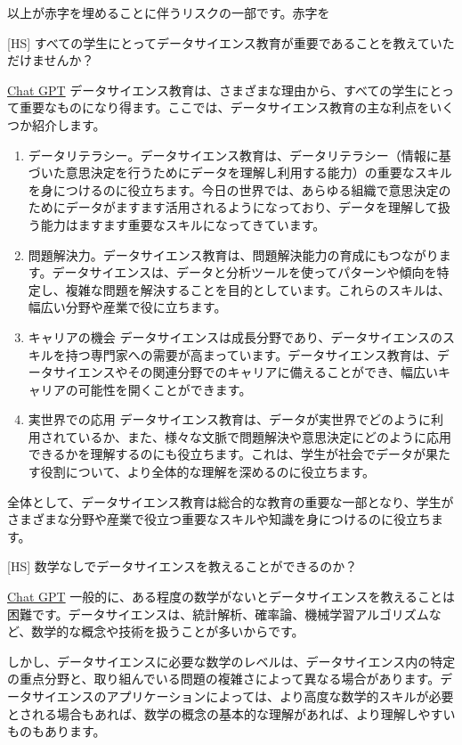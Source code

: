 \documentclass[
]{book}
\theoremstyle{definition}
\theoremstyle{definition}
\theoremstyle{definition}
\theoremstyle{definition}
\theoremstyle{remark}
\begin{document}
以上が赤字を埋めることに伴うリスクの一部です。赤字を

{[}HS{]} すべての学生にとってデータサイエンス教育が重要であることを教えていただけませんか？

\protect\hyperlink{chatgpt}{Chat GPT} データサイエンス教育は、さまざまな理由から、すべての学生にとって重要なものになり得ます。ここでは、データサイエンス教育の主な利点をいくつか紹介します。

\begin{enumerate}
\def\labelenumi{\arabic{enumi}.}
\item
  データリテラシー。データサイエンス教育は、データリテラシー（情報に基づいた意思決定を行うためにデータを理解し利用する能力）の重要なスキルを身につけるのに役立ちます。今日の世界では、あらゆる組織で意思決定のためにデータがますます活用されるようになっており、データを理解して扱う能力はますます重要なスキルになってきています。
\item
  問題解決力。データサイエンス教育は、問題解決能力の育成にもつながります。データサイエンスは、データと分析ツールを使ってパターンや傾向を特定し、複雑な問題を解決することを目的としています。これらのスキルは、幅広い分野や産業で役に立ちます。
\item
  キャリアの機会 データサイエンスは成長分野であり、データサイエンスのスキルを持つ専門家への需要が高まっています。データサイエンス教育は、データサイエンスやその関連分野でのキャリアに備えることができ、幅広いキャリアの可能性を開くことができます。
\item
  実世界での応用 データサイエンス教育は、データが実世界でどのように利用されているか、また、様々な文脈で問題解決や意思決定にどのように応用できるかを理解するのにも役立ちます。これは、学生が社会でデータが果たす役割について、より全体的な理解を深めるのに役立ちます。
\end{enumerate}

全体として、データサイエンス教育は総合的な教育の重要な一部となり、学生がさまざまな分野や産業で役立つ重要なスキルや知識を身につけるのに役立ちます。

{[}HS{]} 数学なしでデータサイエンスを教えることができるのか？

\protect\hyperlink{chatgpt}{Chat GPT} 一般的に、ある程度の数学がないとデータサイエンスを教えることは困難です。データサイエンスは、統計解析、確率論、機械学習アルゴリズムなど、数学的な概念や技術を扱うことが多いからです。

しかし、データサイエンスに必要な数学のレベルは、データサイエンス内の特定の重点分野と、取り組んでいる問題の複雑さによって異なる場合があります。データサイエンスのアプリケーションによっては、より高度な数学的スキルが必要とされる場合もあれば、数学の概念の基本的な理解があれば、より理解しやすいものもあります。
\end{document}
